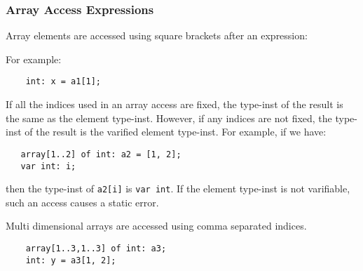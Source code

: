 \documentclass[10pt]{scrartcl}
\begin{document}
\subsubsection{Array Access Expressions}
        \label{Array Access Expressions}

Array elements are accessed using square brackets after an expression:
\begin{productions}
    \RuleArrayAccessTail
\end{productions}
For example:
\begin{verbatim}
    int: x = a1[1];
\end{verbatim}

If all the indices used in an array access are fixed, the type-inst of the
result is the same as the element type-inst.  However, if any
indices are not fixed, the type-inst of the result is the varified element
type-inst.  For example, if we have:
\begin{verbatim}
   array[1..2] of int: a2 = [1, 2];
   var int: i;
\end{verbatim}
then the type-inst of \texttt{a2[i]} is \texttt{var int}.  If the element type-inst
is not varifiable, such an access causes a static error.

Multi dimensional arrays 
are accessed using comma separated indices.
\begin{verbatim}
    array[1..3,1..3] of int: a3;
    int: y = a3[1, 2];
\end{verbatim}

\end{document}
